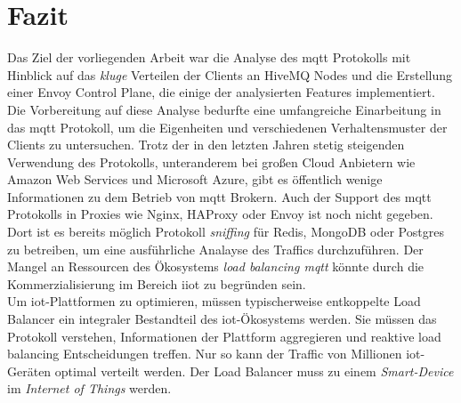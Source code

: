 \section{Fazit}
Das Ziel der vorliegenden Arbeit war die Analyse des \ac{mqtt} Protokolls mit Hinblick auf das \textit{kluge} Verteilen der Clients an HiveMQ Nodes und die Erstellung einer Envoy Control Plane, die einige der analysierten Features implementiert.
\\
Die Vorbereitung auf diese Analyse bedurfte eine umfangreiche Einarbeitung in das \ac{mqtt} Protokoll, um die Eigenheiten und verschiedenen Verhaltensmuster der Clients zu untersuchen.
Trotz der in den letzten Jahren stetig steigenden Verwendung des Protokolls, unteranderem bei gro{\ss}en Cloud Anbietern wie Amazon Web Services und Microsoft Azure, gibt es öffentlich wenige Informationen zu dem Betrieb von \ac{mqtt} Brokern.
Auch der Support des \ac{mqtt} Protokolls in Proxies wie Nginx, HAProxy oder Envoy ist noch nicht gegeben. Dort ist es bereits möglich Protokoll \textit{sniffing} für Redis, MongoDB oder Postgres zu betreiben, um eine ausführliche Analayse des Traffics durchzuführen.
Der Mangel an Ressourcen des Ökosystems \textit{load balancing \ac{mqtt}} könnte durch die Kommerzialisierung im Bereich \ac{iiot} zu begründen sein.
\\
Um \ac{iot}-Plattformen zu optimieren, müssen typischerweise entkoppelte Load Balancer ein integraler Bestandteil des \ac{iot}-Ökosystems werden. Sie müssen das Protokoll verstehen, Informationen der Plattform aggregieren und reaktive load balancing Entscheidungen treffen.
Nur so kann der Traffic von Millionen \ac{iot}-Geräten optimal verteilt werden.
Der Load Balancer muss zu einem \textit{Smart-Device} im \textit{Internet of Things} werden.
\newpage

